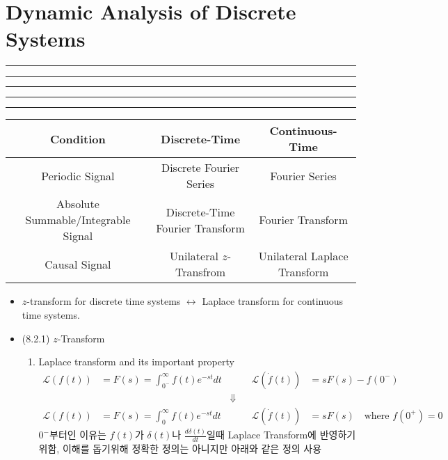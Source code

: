 \setcounter{chapter}{7}
\setcounter{section}{1}
\section{Dynamic Analysis of Discrete Systems}
\vspace{-8pt} \hrule \hrule \hrule \hrule \hrule  \vspace{12pt}


\begin{table}[!hb]
\centering
\begin{tabular}{@{}|c|c|c|@{}}
\toprule
Condition                           & Discrete-Time                   & Continuous-Time   \\ \midrule
Periodic Signal                     & Discrete Fourier Series         & Fourier Series    \\ \midrule
Absolute Summable/Integrable Signal & Discrete-Time Fourier Transform & Fourier Transform \\ \midrule
Causal Signal                       & Unilateral $z$-Transfrom          & Unilateral Laplace Transform \\ \bottomrule
\end{tabular}
\end{table}
\begin{itemize}
	\item $z$-transform for discrete time systems $\leftrightarrow$ Laplace transform for continuous time systems. 
\item (8.2.1) $z$-Transform 
	\begin{enumerate}
		\item Laplace transform and its important property 
		\begin{align*}
			\mathcal{L} (f(t))&= F(s) = \int_{0^-}^{\infty} f(t) e^{-st} dt 
			&&&
			\mathcal{L}(\dot{f}(t)) &= sF(s) -f(0^{-})\\
			&&\Downarrow&
			\\
						\mathcal{L} (f(t))&= F(s) = \int_0^{\infty} f(t) e^{-st} dt 
			&&&
			\mathcal{L}(\dot{f}(t)) &= sF(s) \text{ } \text{ where $f(0^+) = 0$}
		\end{align*}
		$0^{-}$부터인 이유는 $f(t)$가 $\delta(t)$나 $\frac{d\delta(t)}{dt}$일때 Laplace Transform에 반영하기 위함, 이해를 돕기위해 정확한 정의는 아니지만 아래와 같은 정의 사용
	\end{enumerate}	
\end{itemize}

